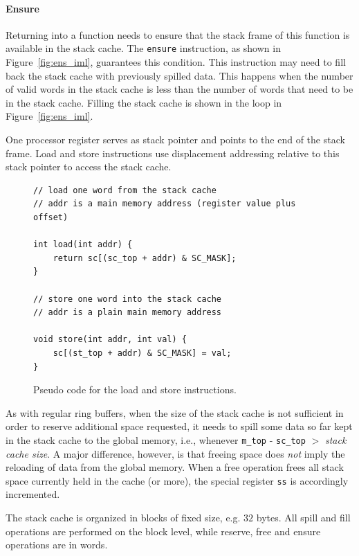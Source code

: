 \documentclass[a4paper,fontsize=10pt,twoside,DIV15,BCOR12mm,headinclude=true,footinclude=false,pagesize,bibtotoc]{scrbook}
\newcommand{\code}[1]{{\texttt{#1}}}
\newcommand{\comment}[3]{

\textsf{\textbf{#1}} {\color{#3}#2}}
\newcommand{\martin}[1]{\comment{Martin}{#1}{Blue}}
\renewcommand{\martin}[1]{}
\begin{document}
\paragraph{Ensure} Returning into a function needs to ensure that the stack
frame of this function is available in the stack cache. The \code{ensure} instruction,
as shown in Figure~\ref{fig:ens_iml}, guarantees this condition.
This instruction may need to fill back the stack cache with previously spilled data.
This happens when the number of valid words in the stack cache is less than the
number of words that need to be in the stack cache.
Filling the stack cache is shown in the loop in Figure~\ref{fig:ens_iml}.

One processor register serves as stack pointer and points to the end of the stack frame.
Load and store instructions use displacement addressing relative to this stack pointer
to access the stack cache.

\begin{figure}
\begin{lstlisting}
// load one word from the stack cache
// addr is a main memory address (register value plus offset)

int load(int addr) {
    return sc[(sc_top + addr) & SC_MASK];
}

// store one word into the stack cache
// addr is a plain main memory address

void store(int addr, int val) {
    sc[(st_top + addr) & SC_MASK] = val;
}
\end{lstlisting}
	\caption{Pseudo code for the load and store instructions.}
 	\label{fig:ld_st_iml}
\end{figure}

\martin{We might update this section with more content from the S\$ paper}

As with regular ring buffers, when the size of the stack cache is not sufficient
in order to reserve additional space requested, it needs to spill some data
so far kept in the stack cache to the global memory, i.e., whenever
\code{m\_top} - \code{sc\_top} $>$ \emph{stack cache size}. A major difference,
however, is that freeing space does \emph{not} imply the reloading of data from
the global memory. When a free operation frees all stack space currently held in
the cache (or more), the special register \texttt{ss} is accordingly
incremented.

The stack cache is organized in blocks of fixed size, e.g. $32$ bytes. All
spill and fill operations are performed on the block level, while reserve, free
and ensure operations are in words.
\martin{We agreed that some size values are needed in the compiler to
generate correct code (soon). So we might bring in stack cache manipulation
in burst blocks as well.}
\end{document}
